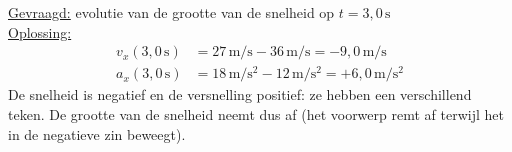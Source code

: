 \documentclass{ximera}
\begin{document}
\begin{exercise}
\begin{question}
\begin{solution}
            \underline{Gevraagd:} evolutie van de grootte van de snelheid op $t = 3{,}0 \, \mathrm{s}$\\

            \underline{Oplossing:}\\
            \begin{align*}
                v_x(3{,}0 \, \mathrm{s}) &= 27 \, \mathrm{m/s} - 36 \, \mathrm{m/s} = -9{,}0 \, \mathrm{m/s}\\
                a_x(3{,}0 \, \mathrm{s}) &= 18 \, \mathrm{m/s^2} - 12 \, \mathrm{m/s^2} = +6{,}0 \, \mathrm{m/s^2}
            \end{align*}
            De snelheid is negatief en de versnelling positief: ze hebben een verschillend teken. De grootte van de snelheid neemt dus af (het voorwerp remt af terwijl het in de negatieve zin beweegt).
        \end{solution}
    \end{question}
\end{exercise}
\end{document}

